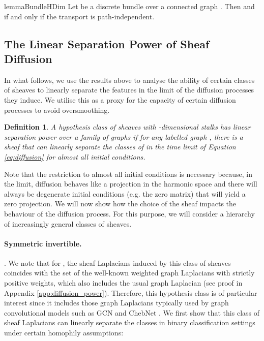 \documentclass{article}
\newtheorem{definition}[theorem]{Definition}
\begin{document}
\begin{restatable}{lemma}{BundleHDim}\label{lemma:bundle_h0_dim}
Let  be a discrete  bundle over a connected graph . Then  and  if and only if the transport is path-independent. 
\end{restatable}





\subsection{The Linear Separation Power of Sheaf Diffusion}\label{sec:diffusion_power}

In what follows, we use the results above to analyse the ability of certain classes of sheaves to linearly separate the features in the limit of the diffusion processes they induce. We utilise this as a proxy for the capacity of certain diffusion processes to avoid oversmoothing.  

\begin{definition}
A hypothesis class of sheaves with -dimensional stalks  has {\em linear separation power} over a family of graphs  if for any labelled graph , there is a sheaf  that can linearly separate the classes of  in the time limit of Equation \ref{eq:diffusion} for 
almost all initial conditions. 
\end{definition}

Note that the restriction to almost all initial conditions is necessary because, in the limit, diffusion behaves like a projection in the harmonic space and there will always be degenerate initial conditions (e.g. the zero matrix) that will yield a zero projection. We will now show how the choice of the sheaf impacts the behaviour of the diffusion process. For this purpose, we will consider a hierarchy of increasingly general classes of sheaves. 
\paragraph*{Symmetric invertible.} 
.
We note that for , the sheaf Laplacians induced by this class of sheaves coincides with the set of the well-known weighted graph Laplacians with strictly positive weights, which also includes the usual graph Laplacian (see proof in Appendix \ref{app:diffusion_power}). Therefore, this hypothesis class is of particular interest since it includes those graph Laplacians typically used by graph convolutional models such as GCN \citep{kipf2017graph} and ChebNet \citep{defferrard2016convolutional}. We first show that this class of sheaf Laplacians can linearly separate the classes in binary classification settings under certain homophily assumptions:
\end{document}
